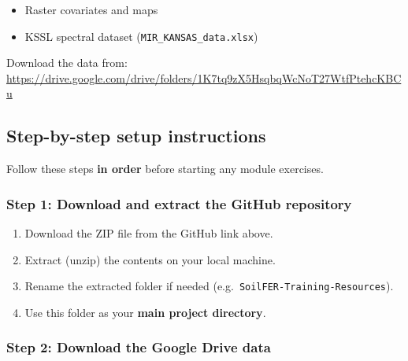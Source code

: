\documentclass[
  10pt,
  b5paper,
  oneside]{book}
\providecommand{\tightlist}{%
  \setlength{\itemsep}{0pt}\setlength{\parskip}{0pt}}
\begin{document}
\begin{itemize}
\tightlist
\item
  Raster covariates and maps\\
\item
  KSSL spectral dataset (\texttt{MIR\_KANSAS\_data.xlsx})
\end{itemize}

Download the data from:\\
\href{https://drive.google.com/drive/folders/1K7tq9zX5HsqbqWcNoT27WtfPtehcKBCu?usp=drive_link}{https://drive.google.com/drive/folders/1K7tq9zX5HsqbqWcNoT27WtfPtehcKBCu}

\subsection*{Step-by-step setup instructions}\label{step-by-step-setup-instructions}

Follow these steps \textbf{in order} before starting any module exercises.

\subsubsection*{Step 1: Download and extract the GitHub repository}\label{step-1-download-and-extract-the-github-repository}

\begin{enumerate}
\def\labelenumi{\arabic{enumi}.}
\tightlist
\item
  Download the ZIP file from the GitHub link above.\\
\item
  Extract (unzip) the contents on your local machine.\\
\item
  Rename the extracted folder if needed (e.g.~\texttt{SoilFER-Training-Resources}).\\
\item
  Use this folder as your \textbf{main project directory}.
\end{enumerate}

\subsubsection*{Step 2: Download the Google Drive data}\label{step-2-download-the-google-drive-data}
\end{document}
